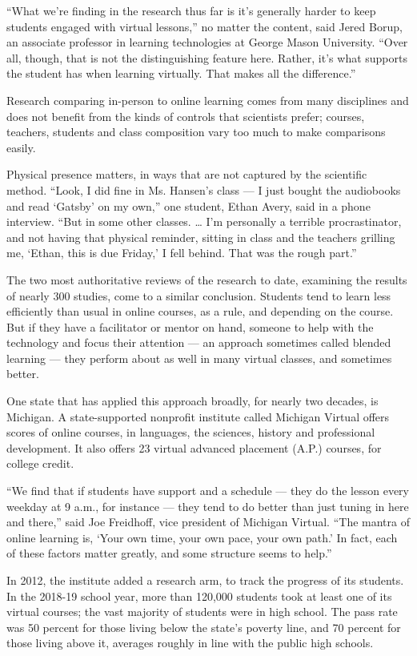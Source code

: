 ``What we're finding in the research thus far is it's generally harder
to keep students engaged with virtual lessons,'' no matter the content,
said Jered Borup, an associate professor in learning technologies at
George Mason University. ``Over all, though, that is not the
distinguishing feature here. Rather, it's what supports the student has
when learning virtually. That makes all the difference.''

Research comparing in-person to online learning comes from many
disciplines and does not benefit from the kinds of controls that
scientists prefer; courses, teachers, students and class composition
vary too much to make comparisons easily.

Physical presence matters, in ways that are not captured by the
scientific method. ``Look, I did fine in Ms. Hansen's class --- I just
bought the audiobooks and read `Gatsby' on my own,'' one student, Ethan
Avery, said in a phone interview. ``But in some other classes. \ldots{}
I'm personally a terrible procrastinator, and not having that physical
reminder, sitting in class and the teachers grilling me, `Ethan, this is
due Friday,' I fell behind. That was the rough part.''

The two most authoritative reviews of the research to date, examining
the results of nearly 300 studies, come to a similar conclusion.
Students tend to learn less efficiently than usual in online courses, as
a rule, and depending on the course. But if they have a facilitator or
mentor on hand, someone to help with the technology and focus their
attention --- an approach sometimes called blended learning --- they
perform about as well in many virtual classes, and sometimes better.

One state that has applied this approach broadly, for nearly two
decades, is Michigan. A state-supported nonprofit institute called
Michigan Virtual offers scores of online courses, in languages, the
sciences, history and professional development. It also offers 23
virtual advanced placement (A.P.) courses, for college credit.

``We find that if students have support and a schedule --- they do the
lesson every weekday at 9 a.m., for instance --- they tend to do better
than just tuning in here and there,'' said Joe Freidhoff, vice president
of Michigan Virtual. ``The mantra of online learning is, `Your own time,
your own pace, your own path.' In fact, each of these factors matter
greatly, and some structure seems to help.''

In 2012, the institute added a research arm, to track the progress of
its students. In the 2018-19 school year, more than 120,000 students
took at least one of its virtual courses; the vast majority of students
were in high school. The pass rate was 50 percent for those living below
the state's poverty line, and 70 percent for those living above it,
averages roughly in line with the public high schools.

